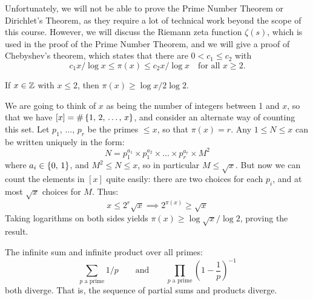 \documentclass{article}
\begin{document}
Unfortunately, we will not be able to prove the Prime Number Theorem or Dirichlet's Theorem, as they require a lot of technical work beyond the scope of this course. However, we will discuss the Riemann zeta function $\zeta(s)$, which is used in the proof of the Prime Number Theorem, and we will give a proof of Chebyshev's theorem, which states that there are $0 < c_1 \leq c_2$ with
\[
c_1 x / \log x \leq \pi(x) \leq c_2 x/\log x
\quad \text{for all $x \geq 2$.}
\]

\begin{proposition}
    If $x \in \mathbb{Z}$ with $x \leq 2$, then $\pi(x) \geq \log x / 2 \log 2$.
\end{proposition}

\begin{prf}
    We are going to think of $x$ as being the number of integers between 1 and $x$, so that we have $[x] = \# \left\lbrace 1, \, 2, \, \dots, \, x \right\rbrace$,
	and consider an alternate way of counting this set. Let $p_1, \, \dots, \, p_r$ be the primes $\leq x$, so that $\pi(x) = r$. Any $1 \leq N \leq x$ can be written uniquely in the form:
	\[
	N = p_1^{a_1} \times p_1^{a_2} \times \dots \times p_r^{a_r} \times M^2
	\]
	where $a_i \in \left\lbrace 0, \, 1 \right\rbrace$, and $M^2 \leq N \leq x$, so in particular $M \leq \sqrt x$. But now we can count the elements in $[x]$ quite easily: there are two choices for each $p_i$, and at most $\sqrt x$ choices for $M$. Thus:
	\[
	x \leq 2^r \sqrt x \implies 2^{\pi(x)} \geq \sqrt x 
	\]
	Taking logarithms on both sides yields $\pi(x) \geq \log \sqrt{x} / \log{2}$, proving the result.
\end{prf}

\begin{proposition}
    The infinite sum and infinite product over all primes:
    \[
    \sum_{p \text{ a prime}}
	1/p
	\qquad \text{and} \qquad
	\prod_{p \text{ a prime}}
	\left( 1 - \frac{1}{p} \right)^{-1}
	\]
	both diverge. That is, the sequence of partial sums and products diverge.
\end{proposition}
\end{document}
